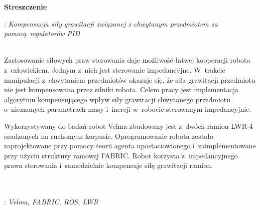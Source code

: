 


\clearpage\mbox{}\thispagestyle{empty}\newpage




%

\clearpage\mbox{}\newpage



\vspace*{\baselineskip}
\begin{center}
	{\large\bfseries Streszczenie}\par\bigskip
\end{center}
: {\itshape Kompensacja siły grawitacji związanej z chwytanym przedmiotem za pomocą regulatorów PID}
\\\\
{
	Zastosowanie siłowych praw sterowania daje możliwość łatwej kooperacji robota z~człowiekiem. Jednym z~nich jest sterowanie impedancyjne. W~trakcie manipulacji z~chwytaniem przedmiotów okazuje się, że siła grawitacji przedmiotu nie jest kompensowana przez silniki robota. Celem pracy jest implementacja algorytmu kompensującego wpływ siły grawitacji chwytanego przedmiotu o~nieznanych parametrach masy i~inercji w~robocie sterowanym impedancyjnie.
	
	Wykorzystywany do badań robot Velma zbudowany jest z~dwóch ramion LWR-4 osadzonych na ruchomym korpusie. Oprogramowanie robota zostało zaprojektowane przy pomocy teorii agenta upostaciowionego i~zaimplementowane przy użyciu struktury ramowej FABRIC. Robot korzysta z~impedancyjnego prawa sterowania i~samodzielnie kompensuje siłę grawitacji ramion. 
}\\\\
\vspace*{0.6\baselineskip}
: {\itshape Velma, FABRIC, ROS, LWR}

\clearpage\mbox{}\newpage


